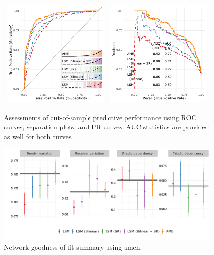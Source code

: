 \documentclass[12pt,pdflatex]{elsarticle}
\newcommand{\pkg}[1]{{\fontseries{b}\selectfont #1}}
\begin{document}
\begin{figure}[ht]
	\centering
	\begin{tabular}{cc}
	\includegraphics[width=.5\textwidth]{roc_latSpace_outSample} & 
	\includegraphics[width=.5\textwidth]{rocPr_latSpace_outSample}
	\end{tabular}
	\caption{Assessments of out-of-sample predictive performance using ROC curves, separation plots, and PR curves. AUC statistics are provided as well for both curves.}
	\label{fig:roc_latentSpace}
\end{figure}

\begin{figure}[ht]
	\centering
	\includegraphics[width=1\textwidth]{netPerfCoef_latSpace}
	\caption{Network goodness of fit summary using \pkg{amen}.}
	\label{fig:netPerfCoef_latSpace}
\end{figure}
\end{document}
